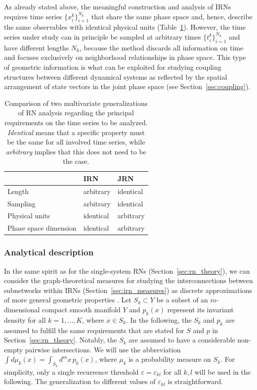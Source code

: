 As already stated above, the meaningful construction and analysis of IRNs requires time series $\{x_i^k\}_{i=1}^{N_k}$ that share the same phase space and, hence, describe the same observables with identical physical units (Table~\ref{tab:multivariate_rns}). However, the time series under study can in principle be sampled at arbitrary times $\{t^k_i\}_{i=1}^{N_k}$ and have different lengths $N_k$, because the method discards all information on time and focuses exclusively on neighborhood relationships in phase space. This type of geometric information is what can be exploited for studying coupling structures between different dynamical systems as reflected by the spatial arrangement of state vectors in the joint phase space (see Section~\ref{sec:coupling}).

\begin{table}[tb]
\caption[Multivariate generalizations of recurrence network analysis]{Comparison of two multivariate generalizations of RN analysis regarding the principal requirements on the time series to be analyzed. \emph{Identical} means that a specific property must be the same for all involved time series, while \emph{arbitrary} implies that this does not need to be the case.}
\centering
\setlength{\tabcolsep}{0.2cm}
\begin{tabular}{lll}
\hline
& IRN & JRN \\
\hline
Length & arbitrary & identical \\
Sampling & arbitrary & identical \\
Physical units & identical & arbitrary \\
Phase space dimension & identical & arbitrary \\
\hline
\end{tabular}
\label{tab:multivariate_rns}
\end{table}%



		\subsubsection{Analytical description}
		In the same spirit as for the single-system RNs (Section~\ref{sec:rn_theory}), we can consider the graph-theoretical measures for studying the interconnections between subnetworks within IRNs (Section~\ref{sec:irn_measures}) as discrete approximations of more general geometric properties \cite{Donges2012PhD}. Let $S_k \subset Y$ be a subset of an $m$-dimensional compact smooth manifold $Y$ and $p_k(x)$ represent its invariant density for all $k=1,\dots,K$, where $x\in S_k$. In the following, the $S_k$ and $p_k$ are assumed to fulfill the same requirements that are stated for $S$ and $p$ in Section~\ref{sec:rn_theory}. Notably, the $S_k$ are assumed to have a considerable non-empty pairwise intersections. We will use the abbreviation $\int d\mu_k(x)=\int_{S_k} d^mx\,p_k(x)$, where $\mu_k$ is a probability measure on $S_k$. For simplicity, only a single recurrence threshold $\varepsilon=\varepsilon_{kl}$ for all $k,l$ will be used in the following. The generalization to different values of $\varepsilon_{kl}$ is straightforward.


